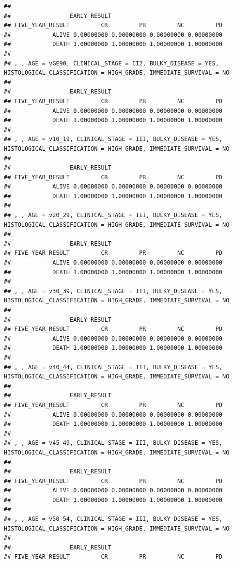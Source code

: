 \documentclass[]{article}
\begin{document}
\begin{verbatim}
## 
##                 EARLY_RESULT
## FIVE_YEAR_RESULT         CR         PR         NC         PD
##            ALIVE 0.00000000 0.00000000 0.00000000 0.00000000
##            DEATH 1.00000000 1.00000000 1.00000000 1.00000000
## 
## , , AGE = vGE90, CLINICAL_STAGE = II2, BULKY_DISEASE = YES, HISTOLOGICAL_CLASSIFICATION = HIGH_GRADE, IMMEDIATE_SURVIVAL = NO
## 
##                 EARLY_RESULT
## FIVE_YEAR_RESULT         CR         PR         NC         PD
##            ALIVE 0.00000000 0.00000000 0.00000000 0.00000000
##            DEATH 1.00000000 1.00000000 1.00000000 1.00000000
## 
## , , AGE = v10_19, CLINICAL_STAGE = III, BULKY_DISEASE = YES, HISTOLOGICAL_CLASSIFICATION = HIGH_GRADE, IMMEDIATE_SURVIVAL = NO
## 
##                 EARLY_RESULT
## FIVE_YEAR_RESULT         CR         PR         NC         PD
##            ALIVE 0.00000000 0.00000000 0.00000000 0.00000000
##            DEATH 1.00000000 1.00000000 1.00000000 1.00000000
## 
## , , AGE = v20_29, CLINICAL_STAGE = III, BULKY_DISEASE = YES, HISTOLOGICAL_CLASSIFICATION = HIGH_GRADE, IMMEDIATE_SURVIVAL = NO
## 
##                 EARLY_RESULT
## FIVE_YEAR_RESULT         CR         PR         NC         PD
##            ALIVE 0.00000000 0.00000000 0.00000000 0.00000000
##            DEATH 1.00000000 1.00000000 1.00000000 1.00000000
## 
## , , AGE = v30_39, CLINICAL_STAGE = III, BULKY_DISEASE = YES, HISTOLOGICAL_CLASSIFICATION = HIGH_GRADE, IMMEDIATE_SURVIVAL = NO
## 
##                 EARLY_RESULT
## FIVE_YEAR_RESULT         CR         PR         NC         PD
##            ALIVE 0.00000000 0.00000000 0.00000000 0.00000000
##            DEATH 1.00000000 1.00000000 1.00000000 1.00000000
## 
## , , AGE = v40_44, CLINICAL_STAGE = III, BULKY_DISEASE = YES, HISTOLOGICAL_CLASSIFICATION = HIGH_GRADE, IMMEDIATE_SURVIVAL = NO
## 
##                 EARLY_RESULT
## FIVE_YEAR_RESULT         CR         PR         NC         PD
##            ALIVE 0.00000000 0.00000000 0.00000000 0.00000000
##            DEATH 1.00000000 1.00000000 1.00000000 1.00000000
## 
## , , AGE = v45_49, CLINICAL_STAGE = III, BULKY_DISEASE = YES, HISTOLOGICAL_CLASSIFICATION = HIGH_GRADE, IMMEDIATE_SURVIVAL = NO
## 
##                 EARLY_RESULT
## FIVE_YEAR_RESULT         CR         PR         NC         PD
##            ALIVE 0.00000000 0.00000000 0.00000000 0.00000000
##            DEATH 1.00000000 1.00000000 1.00000000 1.00000000
## 
## , , AGE = v50_54, CLINICAL_STAGE = III, BULKY_DISEASE = YES, HISTOLOGICAL_CLASSIFICATION = HIGH_GRADE, IMMEDIATE_SURVIVAL = NO
## 
##                 EARLY_RESULT
## FIVE_YEAR_RESULT         CR         PR         NC         PD

\end{verbatim}
\end{document}
